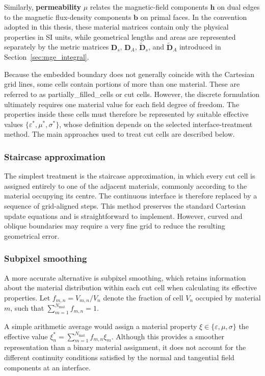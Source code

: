 Similarly, \textbf{permeability} $\mu$ relates the magnetic-field components $\mathbf{h}$ on dual edges to the magnetic flux-density components $\mathbf{b}$ on primal faces. In the convention adopted in this thesis, these material matrices contain only the physical properties in SI units, while geometrical lengths and areas are represented separately by the metric matrices
$\mathbf{D}_{s}$, $\mathbf{D}_{A}$, $\widetilde{\mathbf{D}}_{s}$, and $\widetilde{\mathbf{D}}_{A}$ introduced in Section~\ref{sec:mge_integral}.

Because the embedded boundary does not generally coincide with the Cartesian grid lines, some cells contain portions of more than one material. These are referred to as \glspl{partially_filled_cell} or cut cells. However, the discrete formulation ultimately requires one material value for each field degree of freedom. The properties inside these cells must therefore be represented by suitable effective values $\{\varepsilon^{*},\mu^{*},\sigma^{*}\}$, whose definition depends on the selected interface-treatment method. The main approaches used to treat cut cells are described below.

\subsubsection{Staircase approximation}

The simplest treatment is the \gls{staircase approximation}, in which every cut cell is assigned entirely to one of the adjacent materials, commonly according to the material occupying its centre. The continuous interface is therefore replaced by a sequence of grid-aligned steps. This method preserves the standard Cartesian update equations and is straightforward to implement. However, curved and oblique boundaries may require a very fine grid to reduce the resulting geometrical error.

\subsubsection{Subpixel smoothing}

A more accurate alternative is \gls{subpixel smoothing}, which retains information about the material distribution within each cut cell when calculating its effective properties. Let $f_{m,n}=V_{m,n}/V_n$ denote the fraction of cell $V_n$ occupied by material $m$, such that $\sum_{m=1}^{N_{\mathrm{mat}}}f_{m,n}=1$.

A simple arithmetic average would assign a material property $\xi\in\{\varepsilon,\mu,\sigma\}$ the effective value $\xi_n^{*}=\sum_{m=1}^{N_{\mathrm{mat}}}f_{m,n}\xi_m$. Although this provides a smoother representation than a binary material assignment, it does not account for the different continuity conditions satisfied by the normal and tangential field components at an interface. %

